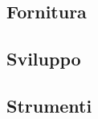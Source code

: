 \subsection{Fornitura}\label{sec:Fornitura}


\subsection{Sviluppo}\label{sec:Sviluppo}

\subsection{Strumenti}\label{sec:Strumenti}
